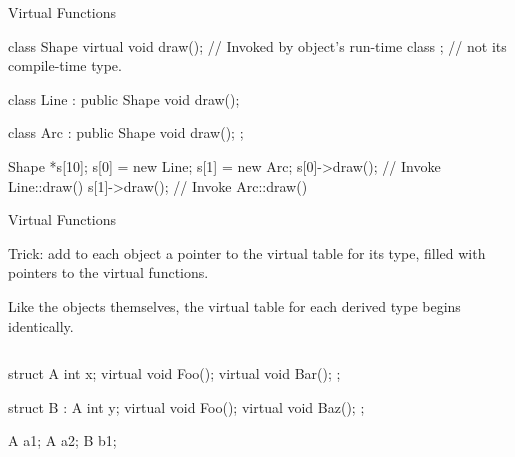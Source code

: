 \documentclass{plt}
\begin{document}
\begin{frame}[fragile]{Virtual Functions}

\begin{cpp}
class Shape {
  virtual void draw(); // Invoked by object's run-time class
};                     // not its compile-time type.

class Line : public Shape {
  void draw();
}

class Arc : public Shape {
  void draw();
};

Shape *s[10];
s[0] = new Line;
s[1] = new Arc;
s[0]->draw();   // Invoke Line::draw()
s[1]->draw();   // Invoke Arc::draw()
\end{cpp}

\end{frame}

\begin{frame}[fragile]{Virtual Functions}

Trick: add to each object a pointer to the virtual table for its type,
filled with pointers to the virtual functions.

Like the objects themselves, the virtual table for each derived type
begins identically.

\begin{columns}
\begin{column}{0.5\textwidth}
\begin{cpp}
struct A {
  int x;
  virtual void Foo();
  virtual void Bar();
};

struct B : A {
  int y;
  virtual void Foo();
  virtual void Baz();
};

A a1;
A a2;
B b1;
\end{cpp}
\end{column}
\begin{column}{0.5\textwidth}
\end{column}
\end{columns}
\end{frame}
\end{document}
